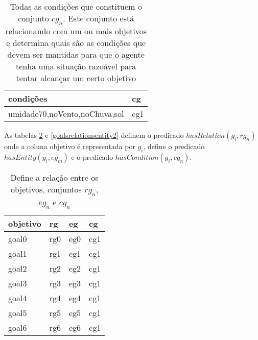 \begin{table}[H]
\centering
{}
\begin{tabular}{|l|l|}
\hline
\textbf{condições}         & \textbf{cg} \\ \hline
umidade70,noVento,noChuva,sol & cg1         \\ \hline
\end{tabular}
\caption{Todas as condições que constituem o conjunto $cg_n$. Este conjunto está relacionando com um ou mais objetivos e determina quais são as condições que devem ser mantidas para que o agente tenha uma situação razoável para tentar alcançar um certo objetivo}
\label{conditions}
\end{table}


As tabelas \ref{goalsrelationsentity1} e \ref{goalsrelationsentity2} definem o predicado $hasRelation(g_i,rg_n)$ onde a coluna objetivo é representada por $g_i$, define o predicado  $hasEntity(g_i,eg_m)$ e o predicado $hasCondition(g_i,cg_n)$.  

\begin{table}[H]
\centering
{}
\begin{tabular}{|l|l|l|l|}
\hline
\textbf{objetivo}  & \textbf{rg} & \textbf{eg} & \textbf{cg} \\ \hline
goal0 & rg0 & eg0 & cg1 \\ \hline
goal1 & rg1 & eg1 & cg1 \\ \hline
goal2 & rg2 & eg2 & cg1 \\ \hline
goal3 & rg3 & eg3 & cg1 \\ \hline
goal4 & rg4 & eg4 & cg1 \\ \hline
goal5 & rg5 & eg5 & cg1 \\ \hline
goal6 & rg6 & eg6 & cg1 \\ \hline		
\end{tabular}
\caption{Define a relação entre os objetivos, conjuntos $rg_n$, $eg_n$ e $cg_n$ }
\label{goalsrelationsentity1}
\end{table}

